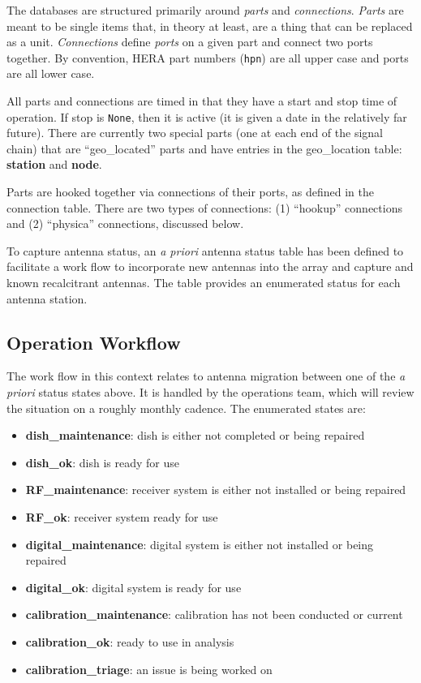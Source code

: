 \documentclass{article}
\begin{document}
The databases are structured primarily around {\em parts} and {\em connections}.  {\em Parts} are meant to be single items that, in theory at least, are a thing that can be replaced as a unit.
{\em Connections} define {\em ports} on a given part and connect two ports together.  By convention, HERA part numbers ({\tt hpn}) are all upper case and ports are all lower case.

All parts and connections are timed in that they have a start and stop time of operation.  If stop is {\tt None}, then it is active (it is given a date in the relatively far future).  There are currently two special parts (one at each end of the signal chain) that are ``geo\_located'' parts and have entries in the geo\_location table: {\bf station} and {\bf node}.

Parts are hooked together via connections of their ports, as defined in the connection table.   There are two types of connections:  (1) ``hookup'' connections and (2) ``physica'' connections, discussed below.

To capture antenna status, an {\em a priori} antenna status table has been defined to facilitate a work flow to incorporate new antennas into the array and capture and known recalcitrant antennas.  The table provides an enumerated status for each antenna station.


\subsection{Operation Workflow}
The work flow in this context relates to antenna migration between one of the {\em a priori} status states above.  It is handled by the operations team, which will review the situation on a roughly monthly cadence.
The enumerated states are:
\begin{itemize}\setlength\itemsep{-.3em}
            \item {\bf dish\_maintenance}: dish is either not completed or being repaired
            \item {\bf dish\_ok}: dish is ready for use
            \item {\bf RF\_maintenance}:  receiver system is either not installed or being repaired
            \item {\bf RF\_ok}:  receiver system ready for use
            \item {\bf digital\_maintenance}:  digital system is either not installed or being repaired
            \item {\bf digital\_ok}: digital system is ready for use
            \item {\bf calibration\_maintenance}:  calibration has not been conducted or current
            \item {\bf calibration\_ok}:  ready to use in analysis
            \item {\bf calibration\_triage}:  an issue is being worked on
\end{itemize}
\end{document}
